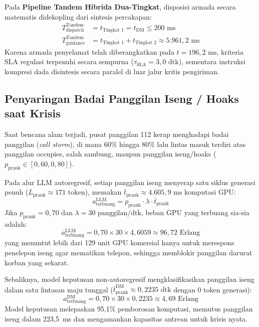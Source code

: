 \documentclass[journal,compsoc]{IEEEtran}
\begin{document}
Pada \textbf{Pipeline Tandem Hibrida Dua-Tingkat}, disposisi armada secara matematis didekopling dari sintesis percakapan:
\begin{equation}
\begin{aligned}
T_{\text{dispatch}}^{\text{Tandem}} &= t_{\text{Tingkat 1}} = t_{\text{DM}} \le 200 \text{ ms} \\
T_{\text{guidance}}^{\text{Tandem}} &= t_{\text{Tingkat 1}} + t_{\text{Tingkat 2}} \approx 5{.}961{,}2 \text{ ms}
\end{aligned}
\end{equation}
Karena armada penyelamat telah diberangkatkan pada $t = 196{,}2 \text{ ms}$, kriteria SLA regulasi terpenuhi secara sempurna ($\tau_{\text{SLA}} = 3{,}0 \text{ dtk}$), sementara instruksi kompresi dada disintesis secara paralel di luar jalur kritis pengiriman.

\subsection{Penyaringan Badai Panggilan Iseng / Hoaks saat Krisis}
Saat bencana alam terjadi, pusat panggilan 112 kerap menghadapi badai panggilan (\textit{call storm}), di mana 60\% hingga 80\% lalu lintas masuk terdiri atas panggilan occupies, salah sambung, maupun panggilan iseng/hoaks ($p_{\text{prank}} \in [0{,}60, 0{,}80]$).

Pada alur LLM autoregresif, setiap panggilan iseng menyerap satu siklus generasi penuh ($L_{\text{prank}} \approx 171 \text{ token}$), memakan $\bar{t}_{\text{prank}} \approx 4.605{,}9 \text{ ms}$ komputasi GPU:
\begin{equation}
a_{\text{terbuang}}^{\text{LLM}} = p_{\text{prank}} \cdot \lambda \cdot \bar{t}_{\text{prank}}
\end{equation}
Jika $p_{\text{prank}} = 0{,}70$ dan $\lambda = 30 \text{ panggilan/dtk}$, beban GPU yang terbuang sia-sia adalah:
\begin{equation}
a_{\text{terbuang}}^{\text{LLM}} = 0{,}70 \times 30 \times 4{,}6059 \approx 96{,}72 \text{ Erlang}
\end{equation}
yang menuntut lebih dari 129 unit GPU komersial hanya untuk merespons penelepon iseng agar mematikan telepon, sehingga memblokir panggilan darurat korban yang sekarat.

Sebaliknya, model keputusan non-autoregresif mengklasifikasikan panggilan iseng dalam satu lintasan maju tunggal ($\bar{t}_{\text{prank}}^{\text{DM}} \approx 0{,}2235 \text{ dtk}$ dengan 0 token generasi):
\begin{equation}
a_{\text{terbuang}}^{\text{DM}} = 0{,}70 \times 30 \times 0{,}2235 \approx 4{,}69 \text{ Erlang}
\end{equation}
Model keputusan melepaskan 95,1\% pemborosan komputasi, memutus panggilan iseng dalam 223,5~ms dan mengamankan kapasitas antrean untuk krisis nyata.
\end{document}
